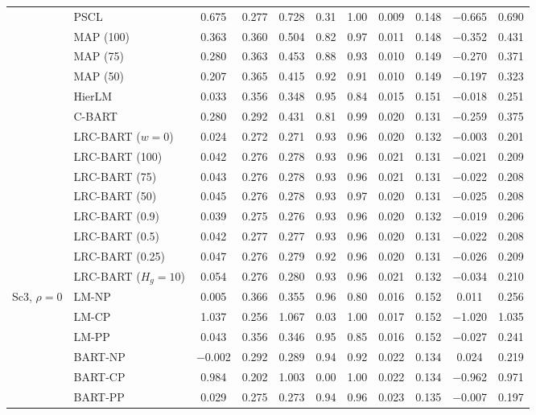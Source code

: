 \documentclass[11pt]{article}
\theoremstyle{definition}
\theoremstyle{plain}
\begin{document}
\begin{center}
\begin{longtable}{llccccccccc}
& PSCL & 0.675 & 0.277 & 0.728 & 0.31 & 1.00 & 0.009 & 0.148 & $-$0.665 & 0.690 \\
& MAP (100) & 0.363 & 0.360 & 0.504 & 0.82 & 0.97 & 0.011 & 0.148 & $-$0.352 & 0.431 \\
& MAP (75) & 0.280 & 0.363 & 0.453 & 0.88 & 0.93 & 0.010 & 0.149 & $-$0.270 & 0.371 \\
& MAP (50) & 0.207 & 0.365 & 0.415 & 0.92 & 0.91 & 0.010 & 0.149 & $-$0.197 & 0.323 \\
& HierLM & 0.033 & 0.356 & 0.348 & 0.95 & 0.84 & 0.015 & 0.151 & $-$0.018 & 0.251 \\
& C-BART & 0.280 & 0.292 & 0.431 & 0.81 & 0.99 & 0.020 & 0.131 & $-$0.259 & 0.375 \\
& LRC-BART ($w=0$) & 0.024 & 0.272 & 0.271 & 0.93 & 0.96 & 0.020 & 0.132 & $-$0.003 & 0.201 \\
& LRC-BART (100) & 0.042 & 0.276 & 0.278 & 0.93 & 0.96 & 0.021 & 0.131 & $-$0.021 & 0.209 \\
& LRC-BART (75) & 0.043 & 0.276 & 0.278 & 0.93 & 0.96 & 0.021 & 0.131 & $-$0.022 & 0.208 \\
& LRC-BART (50) & 0.045 & 0.276 & 0.278 & 0.93 & 0.97 & 0.020 & 0.131 & $-$0.025 & 0.208 \\
& LRC-BART (0.9) & 0.039 & 0.275 & 0.276 & 0.93 & 0.96 & 0.020 & 0.132 & $-$0.019 & 0.206 \\
& LRC-BART (0.5) & 0.042 & 0.277 & 0.277 & 0.93 & 0.96 & 0.020 & 0.131 & $-$0.022 & 0.208 \\
& LRC-BART (0.25) & 0.047 & 0.276 & 0.279 & 0.92 & 0.96 & 0.020 & 0.131 & $-$0.026 & 0.209 \\
& LRC-BART ($H_g=10$) & 0.054 & 0.276 & 0.280 & 0.93 & 0.96 & 0.021 & 0.132 & $-$0.034 & 0.210 \\
\midrule
\multirow{20}{*}{Sc3, $\rho=0$} & LM-NP & 0.005 & 0.366 & 0.355 & 0.96 & 0.80 & 0.016 & 0.152 & 0.011 & 0.256 \\
& LM-CP & 1.037 & 0.256 & 1.067 & 0.03 & 1.00 & 0.017 & 0.152 & $-$1.020 & 1.035 \\
& LM-PP & 0.043 & 0.356 & 0.346 & 0.95 & 0.85 & 0.016 & 0.152 & $-$0.027 & 0.241 \\
& BART-NP & $-$0.002 & 0.292 & 0.289 & 0.94 & 0.92 & 0.022 & 0.134 & 0.024 & 0.219 \\
& BART-CP & 0.984 & 0.202 & 1.003 & 0.00 & 1.00 & 0.022 & 0.134 & $-$0.962 & 0.971 \\
& BART-PP & 0.029 & 0.275 & 0.273 & 0.94 & 0.96 & 0.023 & 0.135 & $-$0.007 & 0.197 \\

\end{longtable}
\end{center}
\end{document}
